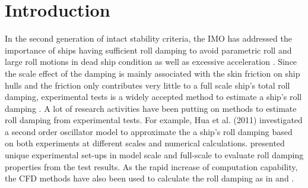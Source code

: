 \section{Introduction}
\label{se:introduction}

In the second generation of intact stability criteria, the IMO has addressed the importance of ships having sufficient roll damping to avoid parametric roll and large roll motions in dead ship condition as well as excessive acceleration \parencite{imo_finalization_2016}. 
Since the scale effect of the damping is mainly associated with the skin friction on ship hulls and the friction only contributes very little to a full scale ship's total roll damping, experimental tests is a widely accepted method to estimate a ship's roll damping \parencite{imo_1200_2006}. A lot of research activities have been putting on methods to estimate roll damping from experimental tests. For example, Hua et al. (2011) investigated a second order oscillator model to approximate the a ship's roll damping based on both experiments at different scales and numerical calculations. \parencite{soder_ikeda_2019} presented unique experimental set-ups in model scale and full-scale to evaluate roll damping properties from the test results. 
As the rapid increase of computation capability, the CFD methods have also been used to calculate the roll damping as in \parencite{kristiansen_experimental_2014} and \parencite{henry_peter_piehl_ship_2016}.  

